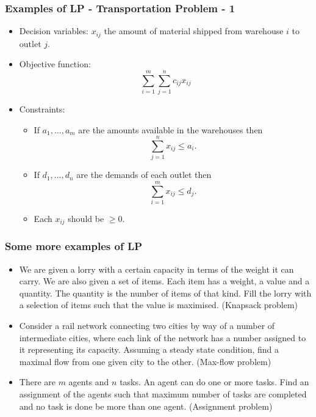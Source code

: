 \documentclass{beamer}
\begin{document}
\begin{frame}
\frametitle{Examples of LP - Transportation Problem - 1}
\begin{itemize}
\item Decision variables: $x_{ij}$ the amount of material shipped from warehouse
$i$ to outlet $j$.
\item Objective function: 
\begin{equation}\nonumber
\sum_{i=1}^m\sum_{j=1}^n c_{ij}x_{ij}
\end{equation}
\item Constraints:
\begin{itemize}
\item If $a_1, \ldots, a_m$ are the amounts available in the warehouses then
\begin{equation}\nonumber
\sum_{j=1}^n x_{ij} \le a_i.
\end{equation}
\item If $d_1, \ldots, d_n$ are the demands of each outlet then
\begin{equation}\nonumber
\sum_{i=1}^m x_{ij} \le d_j.
\end{equation}
\item Each $x_{ij}$ should be $\ge 0$.
\end{itemize}
\end{itemize}
\end{frame}

\begin{frame}
\frametitle{Some more examples of LP}
\begin{itemize}
\item We are given a lorry with a certain capacity in terms of the weight it 
can carry. We are also given a set of items. Each item has a weight, a value 
and a quantity. The quantity is the number of items of that kind. Fill the 
lorry with a selection of items such that the value is maximised. (Knapsack
problem)

\item Consider a rail network connecting two cities by way of a number of 
intermediate cities, where each link of the network has a number assigned to it 
representing its capacity. Assuming a steady state condition, find a maximal 
flow from one given city to the other. (Max-flow problem)

\item There are $m$ agents and $n$ tasks. An agent can do one or more tasks.
Find an assignment of the agents such that maximum number of tasks are completed
and no task is done be more than one agent. (Assignment problem)
 
\end{itemize}
\end{frame}
\end{document}
